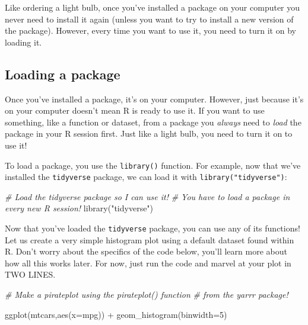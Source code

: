 \documentclass[
]{book}
\newenvironment{Shaded}{\begin{snugshade}}{\end{snugshade}}
\newcommand{\AttributeTok}[1]{\textcolor[rgb]{0.77,0.63,0.00}{#1}}
\newcommand{\CommentTok}[1]{\textcolor[rgb]{0.56,0.35,0.01}{\textit{#1}}}
\newcommand{\DecValTok}[1]{\textcolor[rgb]{0.00,0.00,0.81}{#1}}
\newcommand{\FunctionTok}[1]{\textcolor[rgb]{0.00,0.00,0.00}{#1}}
\newcommand{\NormalTok}[1]{#1}
\newcommand{\SpecialCharTok}[1]{\textcolor[rgb]{0.00,0.00,0.00}{#1}}
\newcommand{\StringTok}[1]{\textcolor[rgb]{0.31,0.60,0.02}{#1}}
\begin{document}
Like ordering a light bulb, once you've installed a package on your computer you never need to install it again (unless you want to try to install a new version of the package). However, every time you want to use it, you need to turn it on by loading it.

\hypertarget{loading-a-package}{%
\subsection{Loading a package}\label{loading-a-package}}

Once you've installed a package, it's on your computer. However, just because it's on your computer doesn't mean R is ready to use it. If you want to use something, like a function or dataset, from a package you \emph{always} need to \emph{load} the package in your R session first. Just like a light bulb, you need to turn it on to use it!

To load a package, you use the \texttt{library()} function. For example, now that we've installed the \texttt{tidyverse} package, we can load it with \texttt{library("tidyverse")}:

\begin{Shaded}
\begin{Highlighting}[]
\CommentTok{\# Load the tidyverse package so I can use it!}
\CommentTok{\#   You have to load a package in every new R session!}
\FunctionTok{library}\NormalTok{(}\StringTok{"tidyverse"}\NormalTok{)}
\end{Highlighting}
\end{Shaded}

Now that you've loaded the \texttt{tidyverse} package, you can use any of its functions! Let us create a very simple histogram plot using a default dataset found within R. Don't worry about the specifics of the code below, you'll learn more about how all this works later. For now, just run the code and marvel at your plot in TWO LINES.

\begin{Shaded}
\begin{Highlighting}[]
\CommentTok{\# Make a pirateplot using the pirateplot() function}
\CommentTok{\#  from the yarrr package!}

\FunctionTok{ggplot}\NormalTok{(mtcars,}\FunctionTok{aes}\NormalTok{(}\AttributeTok{x=}\NormalTok{mpg)) }\SpecialCharTok{+} 
  \FunctionTok{geom\_histogram}\NormalTok{(}\AttributeTok{binwidth=}\DecValTok{5}\NormalTok{)}
\end{Highlighting}
\end{Shaded}
\end{document}
